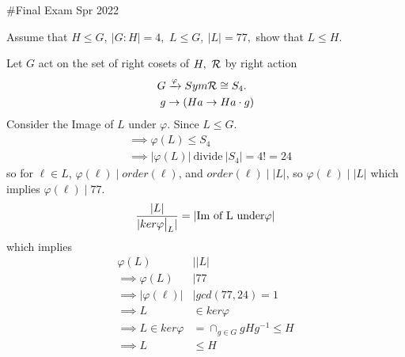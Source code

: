 \documentclass{article}
\begin{document}
\maketitle
\#Final Exam Spr 2022\\
\pagebreak

\begin{homeworkProblem}
    Assume that $H \leq G, \ \lvert G:H \rvert = 4,$ 
    $L \leq G, \ \lvert L \rvert = 77,$ show that $L \leq H$. \\
    \solution 

    Let $G$ act on the set of right cosets of $H, \ \cR$ by right action
    \begin{align}
        G &\xrightarrow{\varphi} Sym \mathcal R \cong S_4.\\
        g &\rightarrow \left( Ha \rightarrow Ha \cdot g \right)
    \end{align}
    Consider the Image of $L$ under $\varphi$. Since $L \leq G$.
    \begin{align}
        &\implies \varphi(L) \leq S_4\\
        &\implies \lvert \varphi(L) \rvert \ \text{divide} \ \lvert S_4 \rvert = 4! = 24
    \end{align}
    so for $\ell \in L$, $\varphi (\ell) \mid order(\ell)$, and
    $order(\ell) \mid \lvert L \rvert$, so $\varphi (\ell) \mid \lvert L \rvert$
    which implies $\varphi(\ell) \mid 77$.
    \begin{align}
        \frac{ \lvert L \rvert }{ \lvert \restr{ker \varphi}{L} \rvert } = \lvert \text{Im of L under} \varphi \rvert
    \end{align}
    which implies 
    \begin{align}
        \varphi(L) &\mid \lvert L \rvert \\
        \implies \varphi(L) &\mid 77 \\
        \implies \lvert \varphi(\ell) \rvert &\mid gcd(77,24)=1\\
        \implies L &\in ker \varphi\\
        \implies L \in ker \varphi &= \cap_{g \in G} gHg^{-1} \leq H\\
        \implies L &\leq H
    \end{align}
    

\end{homeworkProblem}

\pagebreak
\end{document}
